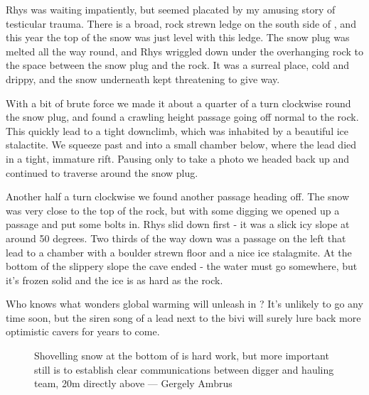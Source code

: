 Rhys was waiting impatiently, but seemed placated by my amusing story of testicular trauma. There is a broad, rock strewn ledge on the south side of  , and this year the top of the snow was just level with this ledge. The snow plug was melted all the way round, and Rhys wriggled down under the overhanging rock to the space between the snow plug and the rock. It was a surreal place, cold and drippy, and the snow underneath kept threatening to give way.

With a bit of brute force we made it about a quarter of a turn clockwise round the snow plug, and found a crawling height passage going off normal to the rock. This quickly lead to a tight downclimb, which was inhabited by a beautiful ice stalactite. We squeeze past and into a small chamber below, where the lead died in a tight, immature rift. Pausing only to take a photo we headed back up and continued to traverse around the snow plug.

Another half a turn clockwise we found another passage heading off. The snow was very close to the top of the rock, but with some digging we opened up a passage and put some bolts in. Rhys slid down first - it was a slick icy slope at around 50 degrees. Two thirds of the way down was a passage on the left that lead to a chamber with a boulder strewn floor and a nice ice stalagmite. At the bottom of the slippery slope the cave ended - the water must go somewhere, but it’s frozen solid and the ice is as hard as the rock.

Who knows what wonders global warming will unleash in  ? It’s unlikely to go any time soon, but the siren song of a lead next to the bivi will surely lure back more optimistic cavers for years to come.


\begin{figure}[b!]
\checkoddpage \ifoddpage \forcerectofloat \else \forceversofloat \fi
\centering
{}
\caption{Shovelling snow at the bottom of \protect{} is hard work, but more important still is to establish clear communications between digger and hauling team, 20m directly above --- Gergely Ambrus}
\label{bottom of M10}
\end{figure}

